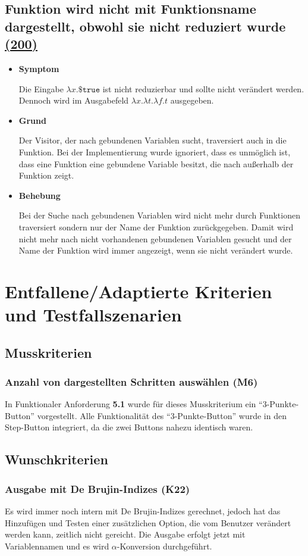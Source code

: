 \documentclass[parskip=full,11pt,twoside]{scrartcl}
\newcommand{\issueref}[1]{
    \href{https://git.scc.kit.edu/ap/Aurora/issues/#1}{(#1)}
}
\newcommand{\regrtest}[5]{
    \subsection{#1 \issueref{#2}}
    \begin{itemize}
        \item \textbf{Symptom}
            #3
        \item \textbf{Grund}
            #4
        \item \textbf{Behebung}
            #5
    \end{itemize}
}
\begin{document}
    \regrtest{Funktion wird nicht mit Funktionsname dargestellt, obwohl sie nicht reduziert wurde}{200}
    {
    	Die Eingabe $\lambda x. \$ \texttt{true}$ ist nicht reduzierbar und sollte nicht verändert werden.
    	Dennoch wird im Ausgabefeld $\lambda x. \lambda t. \lambda f. t$ ausgegeben.
    }{
    	Der Visitor, der nach gebundenen Variablen sucht, traversiert auch in die Funktion.
    	Bei der Implementierung wurde ignoriert, dass es unmöglich ist, dass eine Funktion eine gebundene Variable besitzt,
    	die nach außerhalb der Funktion zeigt.
    }{
    	Bei der Suche nach gebundenen Variablen wird nicht mehr durch Funktionen traversiert sondern nur der Name
    	der Funktion zurückgegeben.
    	Damit wird nicht mehr nach nicht vorhandenen gebundenen Variablen gesucht und der Name der Funktion wird 
    	immer angezeigt, wenn sie nicht verändert wurde.
    }

\section{Entfallene/Adaptierte Kriterien und Testfallszenarien}
\subsection{Musskriterien}

\subsubsection{Anzahl von dargestellten Schritten auswählen (M6)}
	In Funktionaler Anforderung \textbf{5.1} wurde für dieses Musskriterium ein \enquote{3-Punkte-Button}
	vorgestellt.
	Alle Funktionalität des \enquote{3-Punkte-Button} wurde in den Step-Button integriert, da die zwei Buttons nahezu identisch waren. 

\subsection{Wunschkriterien}

\subsubsection{Ausgabe mit De Brujin-Indizes (K22)}
    Es wird immer noch intern mit De Brujin-Indizes gerechnet, jedoch hat das Hinzufügen und Testen einer zusätzlichen Option,
        die vom Benutzer verändert werden kann, zeitlich nicht gereicht.
    Die Ausgabe erfolgt jetzt mit Variablennamen und es wird $\alpha$-Konversion durchgeführt.
\end{document}

